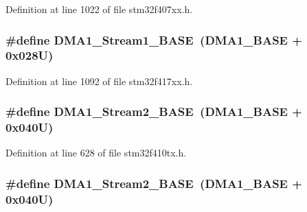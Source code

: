Definition at line 1022 of file stm32f407xx.\+h.

\subsubsection[{\texorpdfstring{D\+M\+A1\+\_\+\+Stream1\+\_\+\+B\+A\+SE}{DMA1_Stream1_BASE}}]{\setlength{\rightskip}{0pt plus 5cm}\#define D\+M\+A1\+\_\+\+Stream1\+\_\+\+B\+A\+SE~({\bf D\+M\+A1\+\_\+\+B\+A\+SE} + 0x028\+U)}\hypertarget{group___peripheral__registers__structures_ga5b4152cef577e37eccc9311d8bdbf3c2}{}\label{group___peripheral__registers__structures_ga5b4152cef577e37eccc9311d8bdbf3c2}


Definition at line 1092 of file stm32f417xx.\+h.

\subsubsection[{\texorpdfstring{D\+M\+A1\+\_\+\+Stream2\+\_\+\+B\+A\+SE}{DMA1_Stream2_BASE}}]{\setlength{\rightskip}{0pt plus 5cm}\#define D\+M\+A1\+\_\+\+Stream2\+\_\+\+B\+A\+SE~({\bf D\+M\+A1\+\_\+\+B\+A\+SE} + 0x040\+U)}\hypertarget{group___peripheral__registers__structures_ga48a551ee91d3f07dd74347fdb35c703d}{}\label{group___peripheral__registers__structures_ga48a551ee91d3f07dd74347fdb35c703d}


Definition at line 628 of file stm32f410tx.\+h.

\subsubsection[{\texorpdfstring{D\+M\+A1\+\_\+\+Stream2\+\_\+\+B\+A\+SE}{DMA1_Stream2_BASE}}]{\setlength{\rightskip}{0pt plus 5cm}\#define D\+M\+A1\+\_\+\+Stream2\+\_\+\+B\+A\+SE~({\bf D\+M\+A1\+\_\+\+B\+A\+SE} + 0x040\+U)}\hypertarget{group___peripheral__registers__structures_ga48a551ee91d3f07dd74347fdb35c703d}{}\label{group___peripheral__registers__structures_ga48a551ee91d3f07dd74347fdb35c703d}


